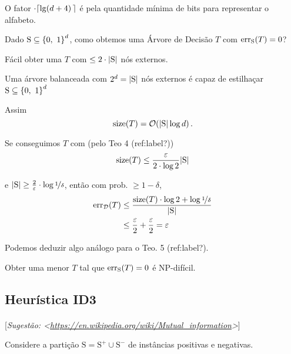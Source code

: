 {\begin{resolucao}
  O fator $\cdot\l\lceil\lg\l(d+4\r)\r\rceil$ é pela quantidade mínima de bits para representar o alfabeto.
\end{resolucao}

Dado $\mathrm{S}\subseteq\l\{0,\ 1\r\}^d$, como obtemos uma Árvore de Decisão $T$ com $\mathrm{err}_\mathrm{S}\l(T\r)=0$?

\begin{exercicio}
  Fácil obter uma $T$ com $\leq2\cdot\l|\mathrm{S}\r|$ nós externos.
\end{exercicio}
\begin{resolucao}
  Uma árvore balanceada com $2^d=\l|\mathrm{S}\r|$ nós externos é capaz de estilhaçar $\mathrm{S}\subseteq\l\{0,\ 1\r\}^d$
\end{resolucao}

Assim
\[
  \mathrm{size}\l(T\r) = \mathcal{O}\l(\l|\mathrm{S}\r|\log d\r).
\]

Se conseguimos $T$ com (pelo Teo 4 (ref:label?))
\[
  \mathrm{size}\l(T\r) \leq \frac{\eps}{2\cdot\log 2} \l|\mathrm{S}\r|
\]

e $\l|\mathrm{S}\r|\geq\frac{2}{\eps}\cdot\log\nicefrac{1}{\delta}$, então com prob. $\geq 1-\delta$,
\begin{align}
  \mathrm{err}_\mathcal{D}\l(T\r) &\leq \frac{\mathrm{size}\l(T\r)\cdot\log2 + \log\nicefrac{1}{\delta}}{\l|\mathrm{S}\r|}  \\
                                  &\leq \frac{\eps}{2} + \frac{\eps}{2} = \eps
\end{align}

Podemos deduzir algo análogo para o Teo. 5 (ref:label?).

\begin{fato}
  Obter uma menor $T$ tal que $\mathrm{err}_\mathrm{S}\l(T\r)=0$ é NP-difícil.
\end{fato}

\clearpage
\subsection{Heurística ID3}

\paragraph{\nopunct}[\textit{Sugestão: <\href{https://en.wikipedia.org/wiki/Mutual\_information}{https://en.wikipedia.org/wiki/Mutual\_information}>}]

Considere a partição $\mathrm{S}=\mathrm{S}^+\cup\mathrm{S}^-$ de instâncias positivas e negativas.

}
